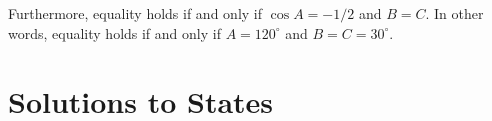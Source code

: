 \documentclass[blue,onecol]{shooting}
\begin{document}
Furthermore, equality holds if and only if $\cos A = -1/2$ and $B = C$. In other words, equality holds if and only if $A = 120^\circ$ and $B = C = 30^\circ$.

%
%
%
%

\chapter{Solutions to States}
\end{document}
